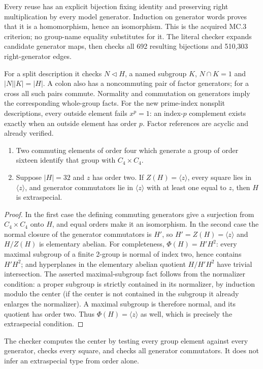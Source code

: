 \documentclass[11pt]{article}
\begin{document}
Every reuse has an explicit bijection fixing identity and preserving
right multiplication by every model generator. Induction on generator
words proves that it is a homomorphism, hence an isomorphism. This is the
acquired MC.3 criterion; no group-name equality substitutes for it.
The literal checker expands candidate generator maps, then checks all
692 resulting bijections and 510,303 right-generator edges.

For a split description it checks $N\triangleleft H$, a named subgroup
$K$, $N\cap K=1$ and $|N||K|=|H|$. A colon also has a noncommuting pair
of factor generators; for a cross all such pairs commute. Normality and
commutation on generators imply the corresponding whole-group facts.
For the new prime-index nonsplit descriptions, every outside element
fails $x^p=1$: an index-$p$ complement exists exactly when an outside
element has order $p$. Factor references are acyclic and already verified.

\newpage
\begin{lemma}
\begin{enumerate}
\item Two commuting elements of order four which generate a group of
order sixteen identify that group with $C_4\times C_4$.
\item Suppose $|H|=32$ and $z$ has order two. If $Z(H)=\langle z\rangle$,
every square lies in $\langle z\rangle$, and generator commutators lie in
$\langle z\rangle$ with at least one equal to $z$, then $H$ is extraspecial.
\end{enumerate}
\end{lemma}
\begin{proof}
In the first case the defining commuting generators give a surjection
from $C_4\times C_4$ onto $H$, and equal orders make it an isomorphism.
In the second case the normal closure of the generator commutators is
$H'$, so $H'=Z(H)=\langle z\rangle$ and $H/Z(H)$ is elementary abelian.
For completeness, $\Phi(H)=H'H^2$: every maximal subgroup of a finite
2-group is normal of index two, hence contains $H'H^2$; and hyperplanes
in the elementary abelian quotient $H/H'H^2$ have trivial intersection.
The asserted maximal-subgroup fact follows from the normalizer condition:
a proper subgroup is strictly contained in its normalizer, by induction
modulo the center (if the center is not contained in the subgroup it
already enlarges the normalizer). A maximal subgroup is therefore normal,
and its quotient has order two. Thus $\Phi(H)=\langle z\rangle$ as well,
which is precisely the extraspecial condition.
\end{proof}
The checker computes the center by testing every group element against
every generator, checks every square, and checks all generator
commutators. It does not infer an extraspecial type from order alone.
\end{document}
